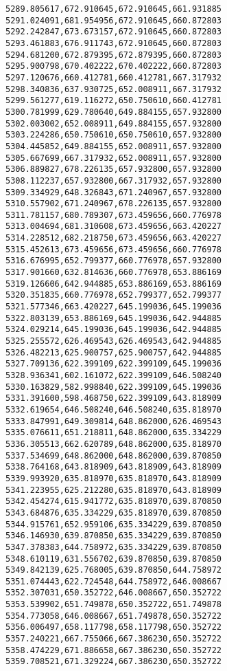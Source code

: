 \documentclass[11pt]{article}
\begin{document}
\begin{Verbatim}[commandchars=\\\{\}]
5289.805617,672.910645,672.910645,661.931885
5291.024091,681.954956,672.910645,660.872803
5292.242847,673.673157,672.910645,660.872803
5293.461883,676.911743,672.910645,660.872803
5294.681200,672.879395,672.879395,660.872803
5295.900798,670.402222,670.402222,660.872803
5297.120676,660.412781,660.412781,667.317932
5298.340836,637.930725,652.008911,667.317932
5299.561277,619.116272,650.750610,660.412781
5300.781999,629.780640,649.884155,657.932800
5302.003002,652.008911,649.884155,657.932800
5303.224286,650.750610,650.750610,657.932800
5304.445852,649.884155,652.008911,657.932800
5305.667699,667.317932,652.008911,657.932800
5306.889827,678.226135,657.932800,657.932800
5308.112237,657.932800,667.317932,657.932800
5309.334929,648.326843,671.240967,657.932800
5310.557902,671.240967,678.226135,657.932800
5311.781157,680.789307,673.459656,660.776978
5313.004694,681.310608,673.459656,663.420227
5314.228512,682.218750,673.459656,663.420227
5315.452613,673.459656,673.459656,660.776978
5316.676995,652.799377,660.776978,657.932800
5317.901660,632.814636,660.776978,653.886169
5319.126606,642.944885,653.886169,653.886169
5320.351835,660.776978,652.799377,652.799377
5321.577346,663.420227,645.199036,645.199036
5322.803139,653.886169,645.199036,642.944885
5324.029214,645.199036,645.199036,642.944885
5325.255572,626.469543,626.469543,642.944885
5326.482213,625.900757,625.900757,642.944885
5327.709136,622.399109,622.399109,645.199036
5328.936341,602.161072,622.399109,646.508240
5330.163829,582.998840,622.399109,645.199036
5331.391600,598.468750,622.399109,643.818909
5332.619654,646.508240,646.508240,635.818970
5333.847991,649.309814,648.862000,626.469543
5335.076611,651.218811,648.862000,635.334229
5336.305513,662.620789,648.862000,635.818970
5337.534699,648.862000,648.862000,639.870850
5338.764168,643.818909,643.818909,643.818909
5339.993920,635.818970,635.818970,643.818909
5341.223955,625.212280,635.818970,643.818909
5342.454274,615.941772,635.818970,639.870850
5343.684876,635.334229,635.818970,639.870850
5344.915761,652.959106,635.334229,639.870850
5346.146930,639.870850,635.334229,639.870850
5347.378383,644.758972,635.334229,639.870850
5348.610119,631.556702,639.870850,639.870850
5349.842139,625.768005,639.870850,644.758972
5351.074443,622.724548,644.758972,646.008667
5352.307031,650.352722,646.008667,650.352722
5353.539902,651.749878,650.352722,651.749878
5354.773058,646.008667,651.749878,650.352722
5356.006497,658.117798,658.117798,650.352722
5357.240221,667.755066,667.386230,650.352722
5358.474229,671.886658,667.386230,650.352722
5359.708521,671.329224,667.386230,650.352722

\end{Verbatim}
\end{document}
